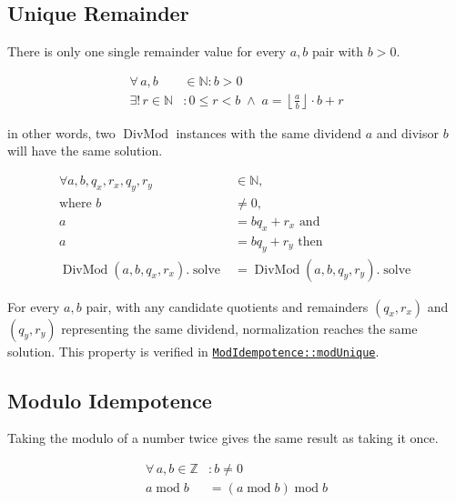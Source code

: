 \subsection{Unique Remainder}
\label{sec:unique-remainder}

There is only one single remainder value for every $a, b$ pair with $b > 0$.

\begin{equation*}
\begin{aligned}
\forall\, a, b &\in \mathbb{N} : b > 0 \\
\exists!\, r \in \mathbb{N} &:
  0 \leq r < b \;\land\;
  a = \left\lfloor \frac{a}{b} \right\rfloor \cdot b + r
\end{aligned}
\end{equation*}

in other words, two $\operatorname{DivMod}$ instances with the same dividend
$a$ and divisor $b$ will have the same solution.

\begin{equation*}
\begin{aligned}
\forall a,b,q_x,r_x,q_y,r_y & \in \mathbb{N}, \\
\text{where } b & \neq 0 \text{, } \\
a & = bq_x + r_x \text{ and } \\
a & = bq_y + r_y \text{ then } \\
\operatorname{DivMod}(a,b,q_x,r_x).\operatorname{solve}
  & = \operatorname{DivMod}(a,b,q_y,r_y).\operatorname{solve}
\end{aligned}
\end{equation*}

For every $a,b$ pair, with any candidate quotients and remainders
$(q_x,r_x)$ and $(q_y,r_y)$ representing the same dividend, normalization
reaches the same solution. This property is verified in
\href{https://github.com/thiagomata/prime-numbers/blob/modulo-article-v1.0.0/src/main/scala/v1/chapter2/div/properties/ModIdempotence.scala#modUnique}{\texttt{ModIdempotence::modUnique}}.

\subsection{Modulo Idempotence}
\label{sec:modulo-idempotence}

Taking the modulo of a number twice gives the same result as taking it once.

\begin{equation*}
\begin{aligned}
\forall\, a, b \in \mathbb{Z} &: b \neq 0 \\
a \operatorname{mod} b
  &= ( a \operatorname{mod} b ) \operatorname{mod} b
\end{aligned}
\end{equation*}

